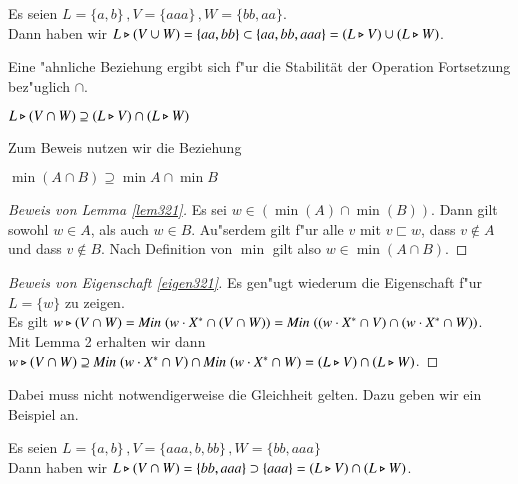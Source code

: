 \vspace{2ex}

\begin{beispiel}
Es seien $L= \{a,b\}\, ,V =\{aaa\}\, ,W = \{bb,aa\}$. \\Dann haben wir $L\triangleright (V\cup W)=\{aa,bb\} \subset \{aa,bb,aaa\} = (L\triangleright V) \cup (L\triangleright W)$.
\end{beispiel}

Eine "ahnliche Beziehung ergibt sich f"ur die Stabilität der Operation Fortsetzung bez"uglich $\cap$.

\vspace{2ex}

\begin{eigen}\label{eigen321}
$L\triangleright (V\cap W)\supseteq (L\triangleright V) \cap (L\triangleright W)$
\end{eigen}
Zum Beweis nutzen wir die Beziehung

\vspace{2ex}

\begin{lem}\label{lem321}
$\min(A\cap B) \supseteq \min A \cap \min B$
\end{lem}

\begin{proof}[Beweis von Lemma \ref{lem321}]
Es sei $w\in (\min(A) \cap \min(B))$. Dann gilt sowohl $w\in A$, als auch $w\in B$. Au"serdem gilt f"ur alle $v$ mit $v\sqsubset w$, dass $v \notin A$ und dass $v \notin B$. Nach Definition von $\min$ gilt also $w\in \min(A\cap B)$.\emph{}
\end{proof}
\begin{proof}[Beweis von Eigenschaft \ref{eigen321}]
Es gen"ugt wiederum die Eigenschaft f"ur $L=\{w\}$ zu zeigen.\\
Es gilt $w\triangleright (V\cap W) = \mathit{Min}\;(w\cdot X^* \cap (V \cap W))= \mathit{Min}\;((w\cdot X^* \cap V) \cap (w\cdot X^* \cap W))$.\\
Mit Lemma 2 erhalten wir dann\\
$ w\triangleright (V\cap W) \supseteq \mathit{Min}\;(w\cdot X^* \cap V) \cap \mathit{Min}\;(w\cdot X^* \cap W)=(L\triangleright V) \cap (L\triangleright W)$.
\end{proof}
Dabei muss nicht notwendigerweise die Gleichheit gelten. Dazu geben wir ein Beispiel an.

\vspace{2ex}

\begin{beispiel}
Es seien $L= \{a,b\}\, ,V =\{aaa,b,bb\}\, ,W = \{bb,aaa\}$\\
Dann haben wir $L\triangleright (V\cap W) = \{bb,aaa\} \supset \{ aaa \} =(L\triangleright V) \cap (L\triangleright W)$.
\end{beispiel}

